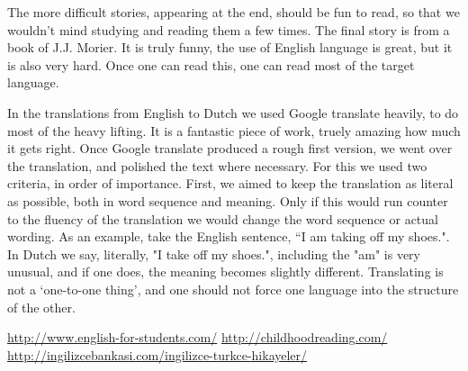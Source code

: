 The more difficult stories, appearing at the end, should be fun to read, so that we wouldn't mind studying and reading them a few times. The final story is from a book of J.J. Morier. It is truly funny, the use of  English language is great, but it is also very hard. Once one can read this, one can read most of the target language. 

In the translations from English to Dutch we used Google translate heavily, to do most of the heavy lifting. It is a fantastic piece of work, truely amazing how much it gets right. Once Google translate produced a rough first version, we went over the translation, and polished the text where necessary. For this we used two criteria, in order of importance. First, we aimed to keep the translation as literal as possible,  both in word sequence and meaning. Only if this would run counter to the fluency of the translation we would change the word sequence or actual wording. As an example, take the English sentence, ``I am taking off my shoes.". In Dutch we say, literally, "I take off my shoes.",  including the "am" is very unusual, and if one does, the meaning becomes slightly different. Translating is not a `one-to-one thing', and one should not force one language into the structure of the other.

\url{http://www.english-for-students.com/}
\url{http://childhoodreading.com/}
\url{http://ingilizcebankasi.com/ingilizce-turkce-hikayeler/}
